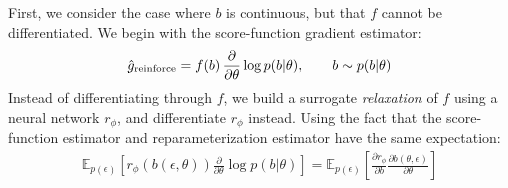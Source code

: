 \documentclass{article}
\newcommand{\E}{\mathbb{E}}
\newcommand{\PT}{\frac{\partial}{\partial \theta}}
\newcommand{\YW}[1]{{\color{red} \bf [[YW: #1]]}}
\newcommand{\LAX}{{\textnormal{LAX}}}
\begin{document}

First, we consider the case where $b$ is continuous, but that $f$ cannot be differentiated.
We begin with the score-function gradient estimator:
%
\begin{align}
\hat g_\textnormal{reinforce} = f \! \left( b \right) \PT \log p(b | \theta), \qquad b \sim p(b|\theta)
\end{align}
%
Instead of differentiating through $f$, we build a surrogate \emph{relaxation} of $f$ using a neural network $r_\phi$, and differentiate $r_\phi$ instead.
Using the fact that the score-function estimator and reparameterization estimator have the same expectation:
%
\begin{align}
\E_{p(\epsilon)} \left[ r_\phi ( b(\epsilon, \theta)) \PT \log p(b | \theta) \right] =
\E_{p(\epsilon)} \left[ \frac{\partial r_\phi}{\partial b} \frac{\partial b(\theta, \epsilon)}{\partial \theta} \right]
\end{align}
%
%
%
%
\end{document}
